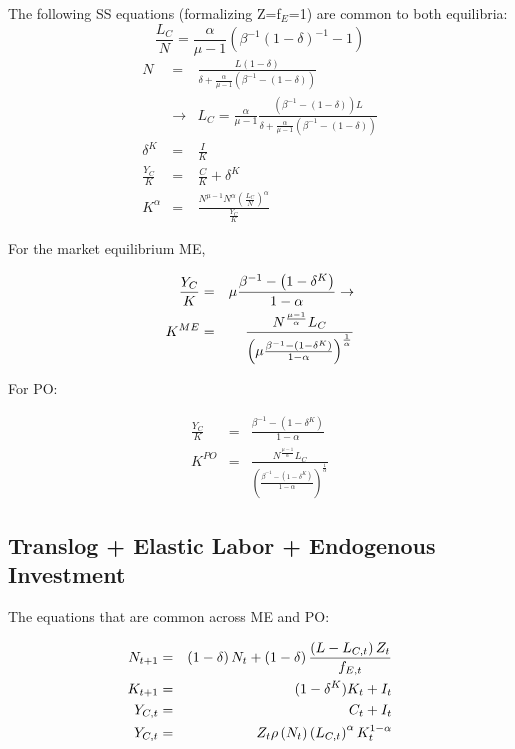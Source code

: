 \documentclass{article}
\begin{document}
The following SS equations (formalizing Z=f$_{E}$=1) are common to both
equilibria:%
\[
\frac{L_{C}}{N}=\frac{\alpha }{\mu -1}\left( \beta ^{-1}\left( 1-\delta
\right) ^{-1}-1\right) 
\]%
\begin{eqnarray*}
N &=&\frac{L\left( 1-\delta \right) }{\delta +\frac{\alpha }{\mu -1}\left(
\beta ^{-1}-\left( 1-\delta \right) \right) } \\
&\rightarrow &L_{C}=\frac{\alpha }{\mu -1}\frac{\left( \beta ^{-1}-\left(
1-\delta \right) \right) L}{\delta +\frac{\alpha }{\mu -1}\left( \beta
^{-1}-\left( 1-\delta \right) \right) } \\
\delta ^{K} &=&\frac{I}{K} \\
\frac{Y_{C}}{K} &=&\frac{C}{K}+\delta ^{K} \\
K^{\alpha } &=&\frac{N^{\mu -1}N^{\alpha }\left( \frac{L_{C}}{N}\right)
^{\alpha }}{\frac{Y_{C}}{K}}
\end{eqnarray*}

For the market equilibrium ME, 

\begin{eqnarray*}
\frac{Y_{C}}{K} &=&\mu \frac{\beta ^{-1}-\left( 1-\delta ^{K}\right) }{%
1-\alpha }\rightarrow  \\
K^{ME} &=&\frac{N^{\frac{\mu -1}{\alpha }}L_{C}}{\left( \mu \frac{\beta
^{-1}-\left( 1-\delta ^{K}\right) }{1-\alpha }\right) ^{\frac{1}{\alpha }}}
\end{eqnarray*}

For PO:

\begin{eqnarray*}
\frac{Y_{C}}{K} &=&\frac{\beta ^{-1}-\left( 1-\delta ^{K}\right) }{1-\alpha }
\\
K^{PO} &=&\frac{N^{\frac{\mu -1}{\alpha }}L_{C}}{\left( \frac{\beta
^{-1}-\left( 1-\delta ^{K}\right) }{1-\alpha }\right) ^{\frac{1}{\alpha }}}
\end{eqnarray*}

\subsection{Translog + Elastic Labor + Endogenous Investment}

The equations that are common across ME and PO:

\begin{eqnarray*}
N_{t+1} &=&\left( 1-\delta \right) N_{t}+\left( 1-\delta \right) \frac{%
\left( L-L_{C,t}\right) Z_{t}}{f_{E,t}} \\
K_{t+1} &=&(1-\delta ^{K})K_{t}+I_{t} \\
Y_{C,t} &=&C_{t}+I_{t} \\
Y_{C,t} &=&Z_{t}\rho \left( N_{t}\right) \left( L_{C,t}\right) ^{\alpha
}K_{t}^{1-\alpha }
\end{eqnarray*}
\end{document}
